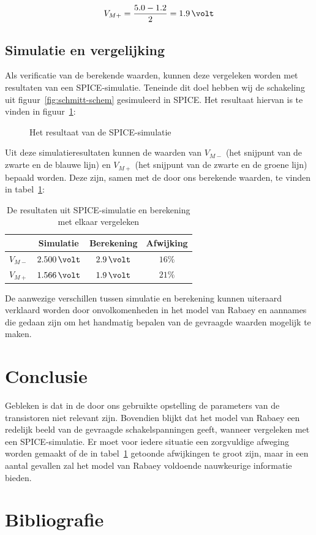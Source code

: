 \documentclass{scrartcl}  %
\begin{document}
\begin{equation} \label{eq:schmitt-mplus-val}
V_{M+} = \frac{5.0-1.2}{2} = 1.9 \,\volt
\end{equation}

\subsection{Simulatie en vergelijking}
\label{subsec:trig-res-verg}
Als verificatie van de berekende waarden, kunnen deze vergeleken worden met resultaten van een SPICE-simulatie. Teneinde dit doel hebben wij de schakeling uit figuur~\ref{fig:schmitt-schem} gesimuleerd in SPICE. Het resultaat hiervan is te vinden in figuur~\ref{fig:trig-sim}:

\begin{figure}[H]
\centering
	\setlength{} 
	\setlength{}
	
	\caption{Het resultaat van de SPICE-simulatie}
	\label{fig:trig-sim}
\end{figure}

Uit deze simulatieresultaten kunnen de waarden van $V_{M-}$ (het snijpunt van de zwarte en de blauwe lijn) en $V_{M+}$ (het snijpunt van de zwarte en de groene lijn) bepaald worden. Deze zijn, samen met de door ons berekende waarden, te vinden in tabel~\ref{tab:trig-results}:

\begin{table}[H]
\centering
\caption{De resultaten uit SPICE-simulatie en berekening met elkaar vergeleken}
\label{tab:trig-results}
\begin{tabular}{c c c c}
	\hline\hline
 	& Simulatie & Berekening & Afwijking \\
 	\hline
	$V_{M-}$ & $2.500\,\volt$ & $2.9\,\volt$ & $16\%$ \\
	$V_{M+}$ & $1.566\,\volt$ & $1.9\,\volt$ & $21\%$ \\
  	\hline
\end{tabular}
\end{table}

De aanwezige verschillen tussen simulatie en berekening kunnen uiteraard verklaard worden door onvolkomenheden in het model van Rabaey en aannames die gedaan zijn om het handmatig bepalen van de gevraagde waarden mogelijk te maken.

\section{Conclusie}
\label{sec:trig-conclusie}
Gebleken is dat in de door ons gebruikte opstelling de parameters van de transistoren niet relevant zijn. Bovendien blijkt dat het model van Rabaey een redelijk beeld van de gevraagde schakelspanningen geeft, wanneer vergeleken met een SPICE-simulatie.
Er moet voor iedere situatie een zorgvuldige afweging worden gemaakt of de in tabel~\ref{tab:trig-results} getoonde afwijkingen te groot zijn, maar in een aantal gevallen zal het model van Rabaey voldoende nauwkeurige informatie bieden.

\newpage
{}

\section{Bibliografie}
\printbibliography
\end{document}

